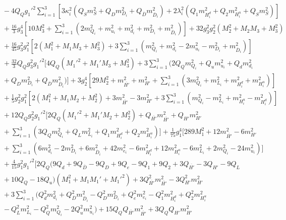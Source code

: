 \documentclass[preprint,amsmath,amssymb,aps,superscriptaddress,prd,showpacs,floatfix,nofootinbib]{revtex4-1}
\begin{document}
\begin{subequations}
\begin{align}
&{}-4Q_Qg_1'^2\sum_{i=1}^3\left [ 3\kappa_i^2\left ( Q_Sm_S^2+Q_Dm_{D_i}^2+Q_{\overline{D}}m_{\overline{D}_i}^2\right )+2\lambda_i^2\left ( Q_1m_{H_i^d}^2+Q_2m_{H_i^u}^2+Q_Sm_S^2\right )\right ]\nonumber\\
&{}+\frac{16}{3}g_3^4\left [ 10M_3^2+\sum_{i=1}^3\left ( 2m_{Q_i}^2+m_{u_i}^2+m_{d_i}^2+m_{D_i}^2+m_{\overline{D}_i}^2\right )\right ]+32g_3^2g_2^2\left ( M_2^2+M_2M_3+M_3^2\right )\nonumber\\
&{}+\frac{16}{45}g_3^2g_1^2\left [ 2\left ( M_1^2+M_1M_3+M_3^2\right )+3\sum_{i=1}^3\left ( m_{Q_i}^2+m_{d_i}^2-2m_{u_i}^2-m_{D_i}^2+m_{\overline{D}_i}^2\right )\right ]\nonumber\\
&{}+\frac{32}{3}Q_Qg_3^2g_1'^2\bigg [ 4Q_Q\left ( M_1'^2+M_1'M_3+M_3^2 \right )+3\sum_{i=1}^3\big ( 2Q_Qm_{Q_i}^2+Q_um_{u_i}^2+Q_dm_{d_i}^2\nonumber\\
&{}+Q_Dm_{D_i}^2+Q_{\overline{D}}m_{\overline{D}_i}^2 \big )\bigg ]+3g_2^4\left [ 29M_2^2+m_{\overline{H'}}^2+m_{H'}^2+\sum_{i=1}^3\left ( 3m_{Q_i}^2+m_{L_i}^2+m_{H_i^d}^2+m_{H_i^u}^2\right )\right ]\nonumber\\
&{}+\frac{1}{5}g_2^2g_1^2\left [ 2\left ( M_1^2+M_1M_2+M_2^2 \right )+3m_{\overline{H'}}^2-3m_{H'}^2+3\sum_{i=1}^3\left ( m_{Q_i}^2-m_{L_i}^2+m_{H_i^u}^2-m_{H_i^d}^2\right )\right ]\nonumber\\
&{}+12Q_Qg_2^2g_1'^2\bigg [ 2Q_Q\left ( M_1'^2+M_1'M_2+M_2^2\right )+Q_{\overline{H'}}m_{\overline{H'}}^2+Q_{H'}m_{H'}^2\nonumber\\
&{}+\sum_{i=1}^3\left ( 3Q_Qm_{Q_i}^2+Q_Lm_{L_i}^2+Q_1m_{H_i^d}^2+Q_2m_{H_i^u}^2\right )\bigg ]+\frac{1}{75}g_1^4\bigg [ 289M_1^2+12m_{\overline{H'}}^2-6m_{H'}^2\nonumber\\
&{}+\sum_{i=1}^3\left ( 6m_{d_i}^2-2m_{D_i}^2+6m_{\overline{D}_i}^2+42m_{e_i}^2-6m_{H_i^d}^2+12m_{H_i^u}^2-6m_{L_i}^2+2m_{Q_i}^2-24m_{u_i}^2\right )\bigg ]\nonumber\\
&{}+\frac{4}{15}g_1^2g_1'^2\bigg [ 2Q_Q\big ( 9Q_d+9Q_{\overline{D}}-9Q_D+9Q_e-9Q_1+9Q_2+3Q_{\overline{H'}}-3Q_{H'}-9Q_L\nonumber\\
&{}+10Q_Q-18Q_u\big )\left ( M_1^2+M_1M_1'+M_1'^2\right )+3Q_{\overline{H'}}^2m_{\overline{H'}}^2-3Q_{H'}^2m_{H'}^2\nonumber\\
&{}+3\sum_{i=1}^3\big ( Q_d^2m_{d_i}^2+Q_{\overline{D}}^2m_{\overline{D}_i}^2-Q_D^2m_{D_i}^2+Q_e^2m_{e_i}^2-Q_1^2m_{H_i^d}^2+Q_2^2m_{H_i^u}^2\nonumber\\
&{}-Q_L^2m_{L_i}^2-Q_Q^2m_{Q_i}^2-2Q_u^2m_{u_i}^2\big )+15Q_QQ_{\overline{H'}}m_{\overline{H'}}^2+3Q_QQ_{H'}m_{H'}^2\nonumber\\

\end{align}
\end{subequations}
\end{document}
